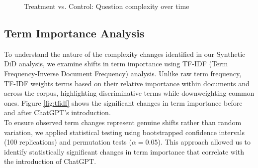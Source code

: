 \begin{figure}[H]
    \centering
    
    \caption{Treatment vs. Control: Question complexity over time}
    \label{fig:complex}
\end{figure}


\subsection{Term Importance Analysis}
To understand the nature of the complexity changes identified in our Synthetic DiD analysis, we examine shifts in term importance using TF-IDF (Term Frequency-Inverse Document Frequency) analysis. Unlike raw term frequency, TF-IDF weights terms based on their relative importance within documents and across the corpus, highlighting discriminative terms while downweighting common ones. Figure \ref{fig:tfidf} shows the significant changes in term importance before and after ChatGPT's introduction.\\

To ensure observed term changes represent genuine shifts rather than random variation, we applied statistical testing using bootstrapped confidence intervals (100 replications) and permutation tests ($\alpha = 0.05$). This approach allowed us to identify statistically significant changes in term importance that correlate with the introduction of ChatGPT.
